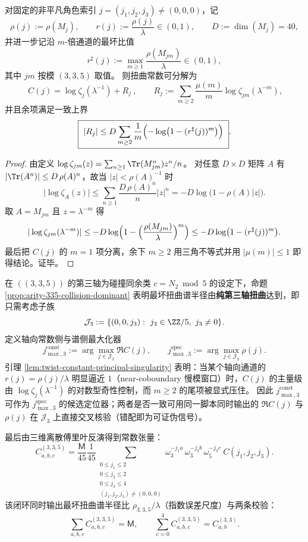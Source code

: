 \begin{lemma}[扭曲常数的主奇点对应与尾项上界]\label{lem:twist-constant-principal-singularity}
对固定的非平凡角色索引 \(j=(j_1,j_2,j_3)\neq(0,0,0)\)，记
\[
\rho(j):=\rho(M_j),\qquad r(j):=\frac{\rho(j)}{\lambda}\in(0,1),
\qquad D:=\dim(M_j)=40,
\]
并进一步记沿 \(m\)-倍通道的最坏比值
\[
r^\sharp(j):=\max_{m\ge 1}\frac{\rho(M_{jm})}{\lambda}\in(0,1),
\]
其中 \(jm\) 按模 \((3,3,5)\) 取值。
则扭曲常数可分解为
\[
\boxed{\ C(j)=\log\zeta_j(\lambda^{-1})+R_j\ },
\qquad
R_j:=\sum_{m\ge 2}\frac{\mu(m)}{m}\log\zeta_{jm}(\lambda^{-m}),
\]
并且余项满足一致上界
\[
\boxed{\ |R_j|\le D\sum_{m\ge 2}\frac{1}{m}\Bigl(-\log\bigl(1-(r^\sharp(j))^{m}\bigr)\Bigr)\ }.
\]
\end{lemma}
\begin{proof}
由定义
\(
\log\zeta_{jm}(z)=\sum_{n\ge 1}\Tr(M_{jm}^n)z^n/n
\)。
对任意 \(D\times D\) 矩阵 \(A\) 有 \(|\Tr(A^n)|\le D\,\rho(A)^n\)，故当 \(|z|<\rho(A)^{-1}\) 时
\[
\bigl|\log\zeta_A(z)\bigr|
\le
\sum_{n\ge 1}\frac{D\,\rho(A)^n}{n}|z|^n
=
-D\log\bigl(1-\rho(A)|z|\bigr).
\]
取 \(A=M_{jm}\) 且 \(z=\lambda^{-m}\) 得
\[
|\log\zeta_{jm}(\lambda^{-m})|
\le
-D\log\Bigl(1-\Bigl(\frac{\rho(M_{jm})}{\lambda}\Bigr)^{m}\Bigr)
\le
-D\log\bigl(1-(r^\sharp(j))^m\bigr).
\]
最后把 \(C(j)\) 的 \(m=1\) 项分离，余下 \(m\ge 2\) 用三角不等式并用 \(|\mu(m)|\le 1\) 即得结论。证毕。
\end{proof}

\begin{corollary}\label{cor:twist-constant-locates-slowest-mode}
在 \(((3,3,5))\) 的第三轴为碰撞同余类 \(c=N_2\bmod 5\) 的设定下，命题 \ref{prop:arity-335-collision-dominant} 表明最坏扭曲谱半径由\textbf{纯第三轴扭曲}达到，即只需考虑子族
\[
\mathcal{J}_3:=\{(0,0,j_3):\ j_3\in\ZZ/5,\ j_3\neq 0\}.
\]
定义轴向常数侧与谱侧最大化器
\[
j_{\max,3}^{\mathrm{const}}:=\arg\max_{j\in\mathcal{J}_3}\Re C(j),
\qquad
j_{\max,3}^{\mathrm{spec}}:=\arg\max_{j\in\mathcal{J}_3}\rho(j).
\]
引理 \ref{lem:twist-constant-principal-singularity} 表明：当某个轴向通道的 \(r(j)=\rho(j)/\lambda\) 明显逼近 \(1\)（near-coboundary 慢模窗口）时，\(C(j)\) 的主量级由 \(\log\zeta_j(\lambda^{-1})\) 的对数型奇性控制，而 \(m\ge 2\) 的尾项被显式压住。
因此 \(j_{\max,3}^{\mathrm{const}}\) 可作为 \(j_{\max,3}^{\mathrm{spec}}\) 的候选定位器；两者是否一致可用同一脚本同时输出的 \(\Re C(j)\) 与 \(\rho(j)\) 在 \(\mathcal{J}_3\) 上直接交叉核验（错配即为可证伪信号）。
\end{corollary}

最后由三维离散傅里叶反演得到常数张量：
$$
C^{(3,3,5)}_{a,b,c}
=\frac{\mathsf{M}}{45}
\frac{1}{45}\!\!\!\sum_{\substack{0\le j_1\le 2\\0\le j_2\le 2\\0\le j_3\le 4\\(j_1,j_2,j_3)\ne(0,0,0)}}
\omega_3^{-j_1 a}\,\omega_3^{-j_2 b}\,\omega_5^{-j_3 c}\ C(j_1,j_2,j_3).
$$
该闭环同时输出最坏扭曲谱半径比 $\rho_{3,3,5}/\lambda$（指数误差尺度）与两条校验：
$$
\sum_{a,b,c}C^{(3,3,5)}_{a,b,c}=\mathsf{M},
\qquad
\sum_{c=0}^{4}C^{(3,3,5)}_{a,b,c}=C^{(3,3)}_{a,b}.
$$

